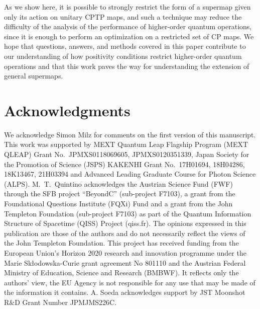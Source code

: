 \documentclass[a4paper,twocolumn,accepted=2022-10-23]{quantumarticle}
\theoremstyle{definition}
\begin{document}
As we show here, it is possible to strongly restrict the form of a supermap given only its action on unitary CPTP maps, and such a technique may reduce the difficulty of the analysis of the performance of higher-order quantum operations, since it is enough to perform an optimization on a restricted set of CP maps.
We hope that questions, answers, and methods covered in this paper contribute to our understanding of how positivity conditions restrict higher-order quantum operations and that this work paves the way for understanding the extension of general supermaps.


\section*{Acknowledgments}

We acknowledge Simon Milz for comments on the first version of this manuscript.
This work was supported by MEXT Quantum Leap Flagship Program (MEXT QLEAP) Grant No.~JPMXS0118069605, JPMXS0120351339,
Japan Society for the Promotion of Science (JSPS) KAKENHI Grant No.~17H01694, 18H04286, 18K13467, 21H03394
and Advanced Leading Graduate Course for Photon Science (ALPS).
M.~T.~Quintino acknowledges the Austrian Science Fund (FWF) through the SFB project ``BeyondC'' (sub-project F7103),
a grant from the Foundational Questions Institute (FQXi) Fund and a grant from the John Templeton Foundation (sub-project F7103)
as part of the Quantum Information Structure of Spacetime (QISS) Project (qiss.fr).
The opinions expressed in this publication are those of the authors and do not necessarily reflect the views of the John Templeton Foundation.
This project has received funding from the European Union’s Horizon 2020 research and innovation programme under the Marie Sk\l odowska-Curie grant agreement No 801110 and the Austrian Federal Ministry of Education, Science and Research (BMBWF).
It reflects only the authors' view, the EU Agency is not responsible for any use that may be made of the information it contains. A. Soeda acknowledges support by JST Moonshot R\&D Grant Number JPMJMS226C.


%


\nocite{apsrev42Control}

%




\clearpage

\onecolumngrid
\appendix
\end{document}
